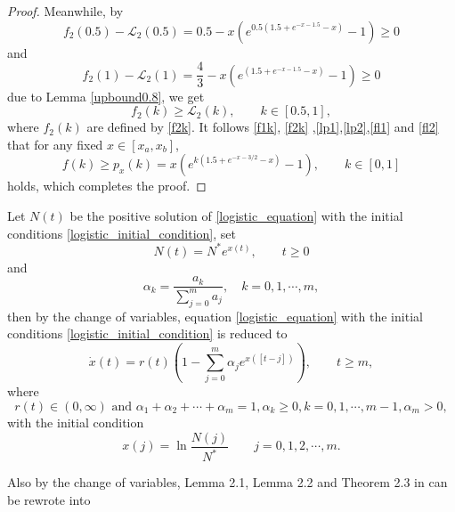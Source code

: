 \documentclass{HZNUMCM}
\begin{document}
\begin{proof}
Meanwhile, by
$$
f_2(0.5)-\mathcal{L}_2(0.5)=0.5-x(e^{0.5(1.5+e^{-x-1.5}-x)}-1)\geqslant 0
$$
and
$$
f_2(1)-\mathcal{L}_2(1)=\frac 4 3 -x(e^{(1.5+e^{-x-1.5}-x)}-1)\geqslant 0
$$
due to Lemma  \ref{upbound0.8}, we get
\begin{equation}\label{fl2}
f_2(k)\geqslant \mathcal{L}_2(k),\qquad k\in[0.5,1],
\end{equation}
where  $f_2(k)$ are defined by  \eqref{f2k}.
It follows \eqref{f1k}, \eqref{f2k} ,\eqref{lp1},\eqref{lp2},\eqref{fl1} and \eqref{fl2} that  for any fixed  $x\in[x_a,x_b]$,$$
f(k)\geqslant p_x(k)=x (e^{k (1.5 + e^{-x -3/ 2} - x)}-1),\qquad k\in[0,1]
$$holds, which completes the proof.

\end{proof}

Let $N(t)$ be the positive solution of  \eqref{logistic_equation} with the initial conditions \eqref{logistic_initial_condition}, set
\begin{equation}\label{changeofvariable}
N(t)=N^*e^{x(t)},\qquad t\geqslant 0
\end{equation}and
$$
\alpha_k=\frac{a_k}{\sum_{j=0}^ma_j},\quad k=0,1,\cdots,m,
$$
then by the change of variables, equation  \eqref{logistic_equation} with the initial conditions \eqref{logistic_initial_condition} is reduced to
\begin{equation}\label{xt_eq_def}
{\dot x(t)}=r(t)(1-\sum_{j=0}^{m} \alpha_je^{x([t-j])}),\qquad t\geqslant m,
\end{equation}where
\begin{equation}\label{logistic_condition_def}
r(t)\in(0,\infty) \text{ and }    \alpha_1+\alpha_2+\cdots+\alpha_m=1, \alpha_k\geqslant 0,k=0,1,\cdots,m-1,\alpha_m>0,
\end{equation}
with the initial condition
\begin{equation}\label{initial_xt_def}
x(j)=\ln \frac{N(j)}{N^*}\qquad j=0,1,2,\cdots,m.
\end{equation}


Also by the change of variables, Lemma 2.1, Lemma 2.2 and Theorem 2.3  in \cite{1995_so_R1339824} can be rewrote into
\end{document}
